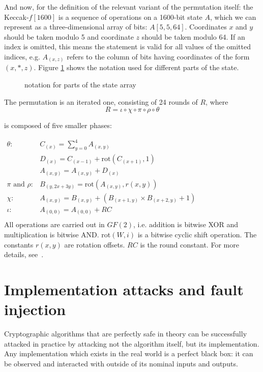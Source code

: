 \documentclass[times, utf8, diplomski]{fer}
\begin{document}
And now, for the definition of the relevant variant of the permutation itself:
the Keccak-$f[1600]$ is a sequence of operations on a 1600-bit state $A$, which
we can represent as a three-dimensional array of bits: $A[5,5,64]$. Coordinates
$x$ and $y$ should be taken modulo 5 and coordinate $z$ should be taken modulo 64.
If an index is omitted, this means the statement is valid for all values of the
omitted indices, e.g. $A_{(x,z)}$ refers to the column of bits having coordinates
of the form $(x,\ast,z)$. Figure \ref{fig:keccak_state} shows the notation used
for different parts of the state.

\begin{figure}[htb]\label{fig:keccak_state}
    \centering
    \caption{notation for parts of the state array}
\end{figure}

The permutation is an iterated one, consisting of 24 rounds of $R$, where
\begin{equation*}
  R = \iota \circ \chi \circ \pi \circ \rho \circ \theta
\end{equation*}

is composed of five smaller phases:

$\begin{array}{rl}
  \theta:& C_{(x)} = \sum\limits_{y=0}^4 A_{(x,y)}\\
  &D_{(x)} = C_{(x-1)} + \text{rot}(C_{(x+1)},1)\\
  &A_{(x,y)} = A_{(x,y)} + D_{(x)}\\
  \pi \text{ and }\rho:& B_{(y,2x+3y)} = \text{rot}(A_{(x,y)}, r(x,y))\\
  \chi:& A_{(x,y)} = B_{(x,y)} + (B_{(x+1,y)} \times B_{(x+2,y)} + 1)\\
  \iota:& A_{(0,0)} = A_{(0,0)} + RC\\
\end{array}$\\

All operations are carried out in $GF(2)$, i.e. addition is bitwise XOR and
multiplication is bitwise AND. rot$(W,i)$ is a bitwise cyclic shift operation.
The constants $r(x,y)$ are rotation offsets. $RC$ is the round constant.
For more details, see~\cite{keccak_reference}.



\section{Implementation attacks and fault injection}
Cryptographic algorithms that are perfectly safe in theory can be successfully
attacked in practice by attacking not the algorithm itself, but its implementation.
Any implementation which exists in the real world is a perfect black box: it can
be observed and interacted with outside of its nominal inputs and outputs.
\end{document}
